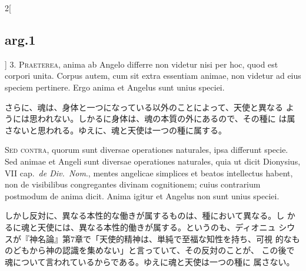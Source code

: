 \documentclass[paper=a4paper,fontsize=10pt,jafontsize=9pt,titlepage]{jlreq}
\begin{document}
\begin{paracol}{2}[\subsection{arg.1}]
3. {\scshape Praeterea}, anima ab Angelo differre non videtur nisi per hoc, quod
est corpori unita. Corpus autem, cum sit extra essentiam animae, non videtur ad
eius speciem pertinere. Ergo anima et Angelus sunt unius speciei.

\switchcolumn

 さらに、魂は、身体と一つになっている以外のことによって、天使と異なる
 ようには思われない。しかるに身体は、魂の本質の外にあるので、その種に
 は属さないと思われる。ゆえに、魂と天使は一つの種に属する。
 
\switchcolumn*[\subsection{s.c.}]

{\scshape Sed contra}, quorum sunt diversae operationes naturales,
ipsa differunt specie. Sed animae et Angeli sunt diversae operationes
naturales, quia ut dicit Dionysius, VII cap.~{\itshape de Div.~Nom}.,
mentes angelicae simplices et beatos intellectus habent, non de
visibilibus congregantes divinam cognitionem; cuius contrarium
postmodum de anima dicit. Anima igitur et Angelus non sunt unius
speciei.

\switchcolumn

 しかし反対に、異なる本性的な働きが属するものは、種において異なる。し
 かるに魂と天使には、異なる本性的働きが属する。というのも、ディオニュ
 シウスが『神名論』第7章で「天使的精神は、単純で至福な知性を持ち、可視
 的なものどもから神の認識を集めない」と言っていて、その反対のことが、
 この後で魂について言われているからである。ゆえに魂と天使は一つの種に
 属さない。
 


\end{paracol}
\end{document}
